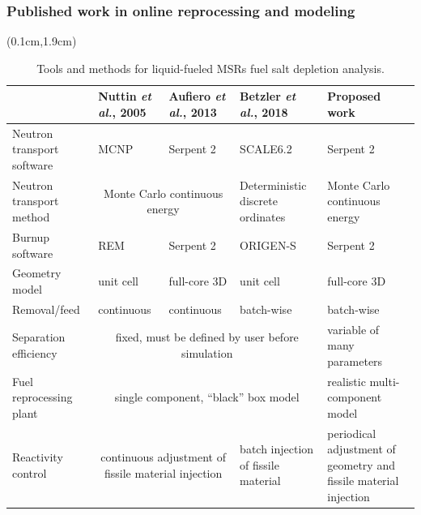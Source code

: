 \begin{frame}
\frametitle{Published work in online reprocessing and modeling}

  \begin{textblock*}{12.5cm}(0.1cm,1.9cm) %
	\begin{table}[t]
	\fontsize{6}{9}\selectfont
	\caption{Tools and methods for liquid-fueled \glspl{MSR} fuel salt depletion 
		analysis.}
	\begin{tabularx}{\textwidth}{X X X X p{3cm}} 
		\hline 
		&Nuttin \emph{et al.}, 2005 \cite{nuttin_potential_2005}& Aufiero \emph{et al.}, 
		2013 \cite{aufiero_extended_2013} & Betzler \emph{et al.}, 2018 
		\cite{betzler_fuel_2018}&Proposed work \\ 
		\hline
		Neutron transport software & \gls{MCNP} & Serpent 2 & SCALE6.2 & Serpent 2 \\ 
		Neutron transport method & \multicolumn{2}{c}{Monte Carlo continuous energy} & 
		Deterministic discrete ordinates & Monte Carlo continuous energy \\
		Burnup software & REM & Serpent 2 & ORIGEN-S & Serpent 2 \\ 
		Geometry model & unit cell & full-core 3D & unit cell & full-core 3D\\ [12pt]
		Removal/feed  & continuous &continuous & batch-wise & batch-wise\\ 
		Separation efficiency &\multicolumn{3}{c}{fixed, must be defined by user 
			before simulation} & variable of many parameters \\
		Fuel reprocessing plant & \multicolumn{3}{c}{single component, ``black'' box 
			model} & realistic multi-component model \\
		Reactivity control & \multicolumn{2}{c}{continuous adjustment of fissile 
			material injection} & batch injection of fissile material & periodical 
		adjustment of geometry and fissile material injection\\
		\hline
	\end{tabularx}
	\label{tab:msr_codes}
\end{table}
\end{textblock*}

\end{frame}


